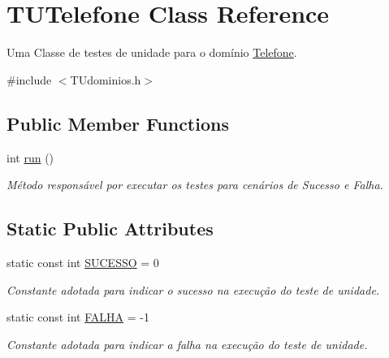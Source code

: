 \hypertarget{classTUTelefone}{}\section{T\+U\+Telefone Class Reference}
\label{classTUTelefone}


Uma Classe de testes de unidade para o domínio \hyperlink{classTelefone}{Telefone}.  




{\ttfamily \#include $<$T\+Udominios.\+h$>$}

\subsection*{Public Member Functions}
\begin{DoxyCompactItemize}
\item 
int \hyperlink{classTUTelefone_abdf98e48a737ab44ad59cc63f26d6788}{run} ()
\begin{DoxyCompactList}\small\item\em Método responsável por executar os testes para cenários de Sucesso e Falha. \end{DoxyCompactList}\end{DoxyCompactItemize}
\subsection*{Static Public Attributes}
\begin{DoxyCompactItemize}
\item 
\mbox{\label{classTUTelefone_a26c0d033f5372652434fdcb5b054c16e}} 
static const int \hyperlink{classTUTelefone_a26c0d033f5372652434fdcb5b054c16e}{S\+U\+C\+E\+S\+SO} = 0
\begin{DoxyCompactList}\small\item\em Constante adotada para indicar o sucesso na execução do teste de unidade. \end{DoxyCompactList}\item 
\mbox{\label{classTUTelefone_a6bfda7ef5af9266bd5ca1b246002f3c7}} 
static const int \hyperlink{classTUTelefone_a6bfda7ef5af9266bd5ca1b246002f3c7}{F\+A\+L\+HA} = -\/1
\begin{DoxyCompactList}\small\item\em Constante adotada para indicar a falha na execução do teste de unidade. \end{DoxyCompactList}\end{DoxyCompactItemize}


